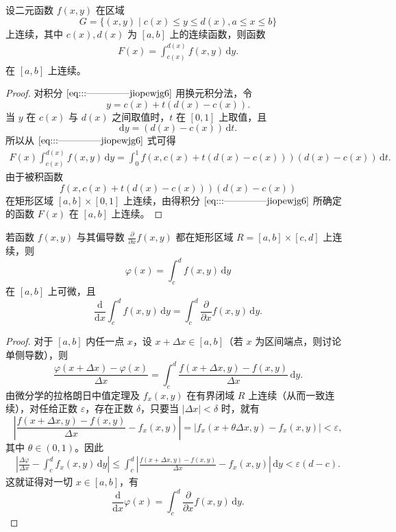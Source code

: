 \documentclass[../../main.tex]{subfiles}
\begin{document}
\begin{theorem}[连续性]\label{theorem:含参量积分的连续性1}
设二元函数 \( f(x,y) \) 在区域
\[
G = \{ (x,y) \mid c(x) \leqslant y \leqslant d(x), a \leqslant x \leqslant b \}
\]
上连续，其中 \( c(x), d(x) \) 为 \( [a,b] \) 上的连续函数，则函数
\begin{align}
F(x) = \int_{c(x)}^{d(x)} f(x,y) \, \mathrm{d}y. \label{eq:::--------------jiopewjg6}
\end{align}
在 \( [a,b] \) 上连续。
\end{theorem}
\begin{proof}
对积分 \(\eqref{eq:::--------------jiopewjg6}\) 用换元积分法，令
\[
y = c(x) + t(d(x) - c(x)).
\]
当 \( y \) 在 \( c(x) \) 与 \( d(x) \) 之间取值时，\( t \) 在 \( [0,1] \) 上取值，且
\[
\mathrm{d}y = (d(x) - c(x)) \, \mathrm{d}t.
\]
所以从 \(\eqref{eq:::--------------jiopewjg6}\) 式可得
\begin{align*}
F(x)  \int_{c(x)}^{d(x)} f(x,y) \, \mathrm{d}y
= \int_{0}^{1} f(x,c(x) + t(d(x) - c(x))) (d(x) - c(x)) \, \mathrm{d}t.
\end{align*}
由于被积函数
\[
f(x,c(x) + t(d(x) - c(x))) (d(x) - c(x))
\]
在矩形区域 \( [a,b] \times [0,1] \) 上连续，由得积分 \(\eqref{eq:::--------------jiopewjg6}\) 所确定的函数 \( F(x) \) 在 \( [a,b] \) 上连续。
\end{proof}

\begin{theorem}[可微性]\label{theorem:含参量积分的可微性1}
若函数 \( f(x,y) \) 与其偏导数 \( \frac{\partial}{\partial x}f(x,y) \) 都在矩形区域 \( R = [a,b] \times [c,d] \) 上连续，则
\[
\varphi(x) = \int_{c}^{d} f(x,y) \, \mathrm{d}y
\]
在 \( [a,b] \) 上可微，且
\[
\frac{\mathrm{d}}{\mathrm{d}x} \int_{c}^{d} f(x,y) \, \mathrm{d}y = \int_{c}^{d} \frac{\partial}{\partial x} f(x,y) \, \mathrm{d}y.
\]
\end{theorem}
\begin{proof}
对于 \( [a,b] \) 内任一点 \( x \)，设 \( x + \Delta x \in [a,b] \)（若 \( x \) 为区间端点，则讨论单侧导数），则
\[
\frac{\varphi(x + \Delta x) - \varphi(x)}{\Delta x} = \int_{c}^{d} \frac{f(x + \Delta x,y) - f(x,y)}{\Delta x} \, \mathrm{d}y.
\]
由微分学的拉格朗日中值定理及 \( f_x(x,y) \) 在有界闭域 \( R \) 上连续（从而一致连续），对任给正数 \( \varepsilon \)，存在正数 \( \delta \)，只要当 \( |\Delta x| < \delta \) 时，就有
\[
\left| \frac{f(x + \Delta x,y) - f(x,y)}{\Delta x} - f_x(x,y) \right|
= |f_x(x + \theta \Delta x,y) - f_x(x,y)| < \varepsilon,
\]
其中 \( \theta \in (0,1) \)。因此
\begin{align*}
\left| \frac{\Delta \varphi}{\Delta x} - \int_{c}^{d} f_x(x,y) \, \mathrm{d}y \right|
\leqslant \int_{c}^{d} \left| \frac{f(x + \Delta x,y) - f(x,y)}{\Delta x} - f_x(x,y) \right| \, \mathrm{d}y
< \varepsilon(d - c).
\end{align*}
这就证得对一切 \( x \in [a,b] \)，有
\[
\frac{\mathrm{d}}{\mathrm{d}x} \varphi(x) = \int_{c}^{d} \frac{\partial}{\partial x} f(x,y) \, \mathrm{d}y.
\]
\end{proof}
\end{document}
